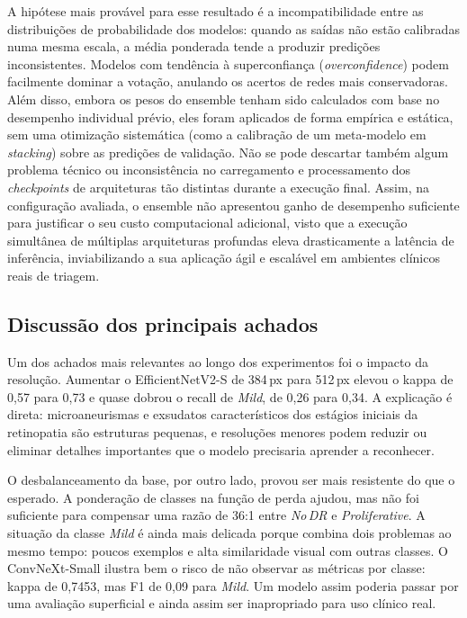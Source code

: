 \documentclass[conference]{IEEEtran}
\begin{document}
A hipótese mais provável para esse resultado é a incompatibilidade entre as distribuições de probabilidade dos modelos: quando as saídas não estão calibradas numa mesma escala, a média ponderada tende a produzir predições inconsistentes. Modelos com tendência à superconfiança (\textit{overconfidence}) podem facilmente dominar a votação, anulando os acertos de redes mais conservadoras. Além disso, embora os pesos do ensemble tenham sido calculados com base no desempenho individual prévio, eles foram aplicados de forma empírica e estática, sem uma otimização sistemática (como a calibração de um meta-modelo em \textit{stacking}) sobre as predições de validação. Não se pode descartar também algum problema técnico ou inconsistência no carregamento e processamento dos \textit{checkpoints} de arquiteturas tão distintas durante a execução final. Assim, na configuração avaliada, o ensemble não apresentou ganho de desempenho suficiente para justificar o seu custo computacional adicional, visto que a execução simultânea de múltiplas arquiteturas profundas eleva drasticamente a latência de inferência, inviabilizando a sua aplicação ágil e escalável em ambientes clínicos reais de triagem.

\subsection{Discussão dos principais achados}

Um dos achados mais relevantes ao longo dos experimentos foi o impacto
da resolução. Aumentar o EfficientNetV2-S de 384\,px para 512\,px
elevou o kappa de 0,57 para 0,73 e quase dobrou o recall de
\textit{Mild}, de 0,26 para 0,34. A explicação é direta:
microaneurismas e exsudatos característicos dos estágios iniciais da
retinopatia são estruturas pequenas, e resoluções menores podem
reduzir ou eliminar detalhes importantes que o modelo precisaria aprender
a reconhecer.

O desbalanceamento da base, por outro lado, provou ser mais resistente
do que o esperado. A ponderação de classes na função de
perda ajudou, mas não foi suficiente para compensar uma razão de
36:1 entre \textit{No\,DR} e \textit{Proliferative}. A situação
da classe \textit{Mild} é ainda mais delicada porque combina dois
problemas ao mesmo tempo: poucos exemplos e alta similaridade visual
com outras classes. O ConvNeXt-Small ilustra bem o risco de não
observar as métricas por classe: kappa de 0,7453, mas F1 de 0,09
para \textit{Mild}. Um modelo assim poderia passar por uma
avaliação superficial e ainda assim ser inapropriado para uso
clínico real.
\end{document}
